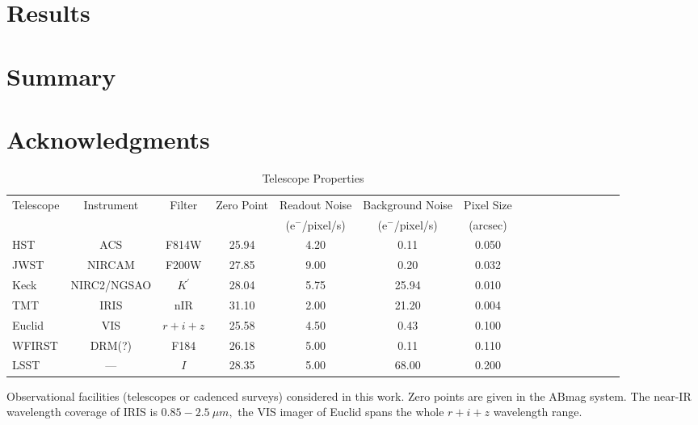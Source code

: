 \documentclass[a4paper,11pt]{article}
\begin{document}
\section{Results}

\section{Summary}

\section*{Acknowledgments}










\clearpage
\begin{table}\footnotesize
\begin{center}
\caption{Telescope Properties}
\begin{tabular}{lccccccccccccccc|}
\hline \hline
Telescope & Instrument & Filter & Zero Point & Readout Noise & Background Noise & Pixel Size \\
 & & & & (e$^-$/pixel/s) & (e$^-$/pixel/s) & (arcsec) \\
\hline
HST  & ACS  &   F814W   &   25.94    &   4.20      &    0.11     &     0.050    \\
  JWST & NIRCAM  &   F200W   &    27.85   &    9.00     &     0.20    &      0.032  \\
  Keck & NIRC2/NGSAO  &  $K^\prime$ &   28.04    &   5.75     &  25.94      &  0.010      \\
  TMT & IRIS  &  nIR   &    31.10   &      2.00   &     21.20    &      0.004  \\
  Euclid & VIS & $r+i+z$  &    25.58   &      4.50   &     0.43    &      0.100   \\
  WFIRST &  DRM(?) & F184    &   26.18    &     5.00    &    0.11     &     0.110   \\
  LSST   & ---  &   $I$    &     28.35  &       5.00  &      68.00   &        0.200  \\
\hline
\hline
\end{tabular}
\begin{tablenotes}
\item 
Observational facilities (telescopes or cadenced surveys) considered in this work.
 Zero points are given in the ABmag system. The near-IR wavelength coverage of IRIS is $0.85-2.5~\mu m,$ the VIS imager of Euclid spans the whole $r+i+z$ wavelength range. \\
\end{tablenotes}
\label{tab:telescopes parameters}
\end{center}
\end{table}
\end{document}
